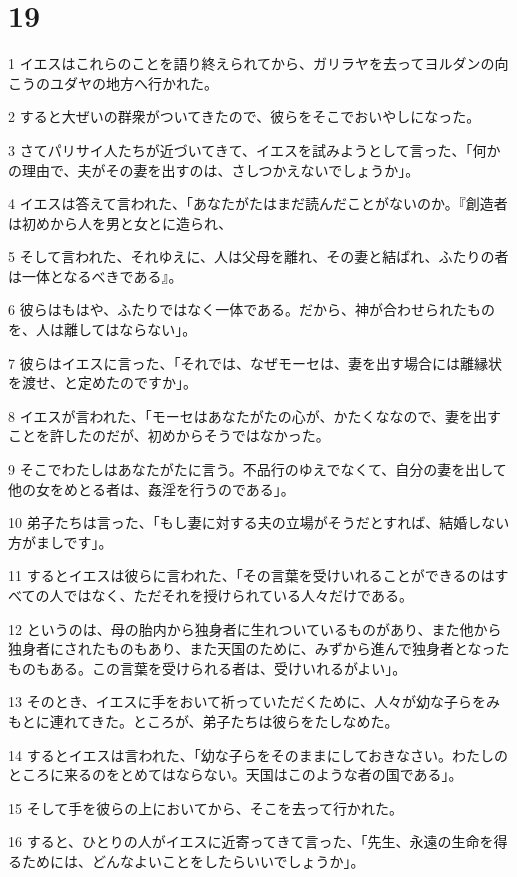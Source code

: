 \chapter{19}

\par 1 イエスはこれらのことを語り終えられてから、ガリラヤを去ってヨルダンの向こうのユダヤの地方へ行かれた。
\par 2 すると大ぜいの群衆がついてきたので、彼らをそこでおいやしになった。
\par 3 さてパリサイ人たちが近づいてきて、イエスを試みようとして言った、「何かの理由で、夫がその妻を出すのは、さしつかえないでしょうか」。
\par 4 イエスは答えて言われた、「あなたがたはまだ読んだことがないのか。『創造者は初めから人を男と女とに造られ、
\par 5 そして言われた、それゆえに、人は父母を離れ、その妻と結ばれ、ふたりの者は一体となるべきである』。
\par 6 彼らはもはや、ふたりではなく一体である。だから、神が合わせられたものを、人は離してはならない」。
\par 7 彼らはイエスに言った、「それでは、なぜモーセは、妻を出す場合には離縁状を渡せ、と定めたのですか」。
\par 8 イエスが言われた、「モーセはあなたがたの心が、かたくななので、妻を出すことを許したのだが、初めからそうではなかった。
\par 9 そこでわたしはあなたがたに言う。不品行のゆえでなくて、自分の妻を出して他の女をめとる者は、姦淫を行うのである」。
\par 10 弟子たちは言った、「もし妻に対する夫の立場がそうだとすれば、結婚しない方がましです」。
\par 11 するとイエスは彼らに言われた、「その言葉を受けいれることができるのはすべての人ではなく、ただそれを授けられている人々だけである。
\par 12 というのは、母の胎内から独身者に生れついているものがあり、また他から独身者にされたものもあり、また天国のために、みずから進んで独身者となったものもある。この言葉を受けられる者は、受けいれるがよい」。
\par 13 そのとき、イエスに手をおいて祈っていただくために、人々が幼な子らをみもとに連れてきた。ところが、弟子たちは彼らをたしなめた。
\par 14 するとイエスは言われた、「幼な子らをそのままにしておきなさい。わたしのところに来るのをとめてはならない。天国はこのような者の国である」。
\par 15 そして手を彼らの上においてから、そこを去って行かれた。
\par 16 すると、ひとりの人がイエスに近寄ってきて言った、「先生、永遠の生命を得るためには、どんなよいことをしたらいいでしょうか」。

